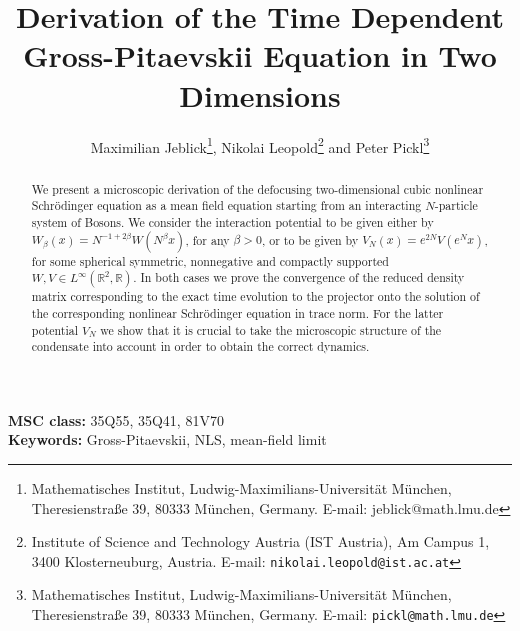\documentclass[11pt, english, american]{article}
\begin{document}
\title{Derivation of the Time Dependent Gross-Pitaevskii Equation in Two Dimensions}




\author{Maximilian Jeblick\footnote{Mathematisches Institut, Ludwig-Maximilians-Universit\"at M\"unchen, Theresienstra\ss e 39, {80333} M\"unchen, Germany. E-mail: jeblick@math.lmu.de},
 Nikolai Leopold\footnote{Institute of Science and Technology Austria (IST Austria), Am Campus 1, 3400 Klosterneuburg, Austria. E-mail: {\tt nikolai.leopold@ist.ac.at}}\;
 and Peter Pickl\footnote{Mathematisches Institut, Ludwig-Maximilians-Universit\"at M\"unchen, Theresienstra\ss e 39, {80333} M\"unchen, Germany. E-mail: {\tt pickl@math.lmu.de}}}



\maketitle




\begin{abstract}
We present a microscopic derivation of the defocusing two-dimensional cubic nonlinear Schr\"odinger equation as a mean field equation starting from an interacting $N$-particle system of Bosons. 
We consider the interaction potential to be given either by $W_\beta(x)=N^{-1+2 \beta}W(N^\beta x)$, for any $\beta>0$, or to be given by $V_N(x)=e^{2N} V(e^N x)$, for some spherical symmetric, nonnegative and compactly supported $W,V \in L^\infty(\mathbb{R}^2,\mathbb{R})$.
In both cases we prove the convergence of the reduced density matrix corresponding to the exact time evolution to the projector onto the solution of the corresponding nonlinear Schr\"odinger equation in trace norm. For the latter potential $V_N$ we show that it is crucial to take the microscopic structure of the condensate into account in order to obtain the correct dynamics.


\end{abstract}

\noindent
\textbf{MSC class:} 35Q55, 35Q41, 81V70   \\
\textbf{Keywords:} Gross-Pitaevskii, NLS, mean-field limit



\newpage
\tableofcontents\newpage




\end{document}
